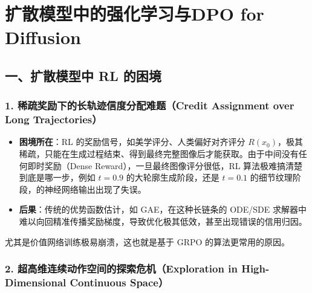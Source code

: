 \setcounter{section}{6}

\hypertarget{ux6269ux6563ux6a21ux578bux4e2dux7684ux5f3aux5316ux5b66ux4e60ux4e0edpo-for-diffusion}{%
\section{扩散模型中的强化学习与DPO for Diffusion}\label{ux6269ux6563ux6a21ux578bux4e2dux7684ux5f3aux5316ux5b66ux4e60ux4e0edpo-for-diffusion}}

\hypertarget{ux4e00ux6269ux6563ux6a21ux578bux4e2d-rl-ux7684ux56f0ux5883}{%
\subsection{一、扩散模型中 RL 的困境}\label{ux4e00ux6269ux6563ux6a21ux578bux4e2d-rl-ux7684ux56f0ux5883}}

\hypertarget{ux7a00ux758fux5956ux52b1ux4e0bux7684ux957fux8f68ux8ff9ux4fe1ux5ea6ux5206ux914dux96beux9898credit-assignment-over-long-trajectories}{%
\subsubsection{1. 稀疏奖励下的长轨迹信度分配难题（Credit Assignment over Long Trajectories）}\label{ux7a00ux758fux5956ux52b1ux4e0bux7684ux957fux8f68ux8ff9ux4fe1ux5ea6ux5206ux914dux96beux9898credit-assignment-over-long-trajectories}}

\begin{itemize}
\tightlist
\item
  \textbf{困境所在}：RL 的奖励信号，如美学评分、人类偏好对齐评分 \(R(x_0)\)，极其稀疏，只能在生成过程结束、得到最终完整图像后才能获取。由于中间没有任何即时奖励（Dense Reward），一旦最终图像评分很低，RL 算法极难搞清楚到底是哪一步，例如 \(t=0.9\) 的大轮廓生成阶段，还是 \(t=0.1\) 的细节纹理阶段，的神经网络输出出现了失误。
\item
  \textbf{后果}：传统的优势函数估计，如 GAE，在这种长链条的 ODE/SDE 求解器中难以向回精准传播奖励梯度，导致优化极其低效，甚至出现错误的信用归因。
\end{itemize}

尤其是价值网络训练极易崩溃，这也就是基于 GRPO 的算法更常用的原因。

\hypertarget{ux8d85ux9ad8ux7ef4ux8fdeux7eedux52a8ux4f5cux7a7aux95f4ux7684ux63a2ux7d22ux5371ux673aexploration-in-high-dimensional-continuous-space}{%
\subsubsection{2. 超高维连续动作空间的探索危机（Exploration in High-Dimensional Continuous Space）}\label{ux8d85ux9ad8ux7ef4ux8fdeux7eedux52a8ux4f5cux7a7aux95f4ux7684ux63a2ux7d22ux5371ux673aexploration-in-high-dimensional-continuous-space}}

